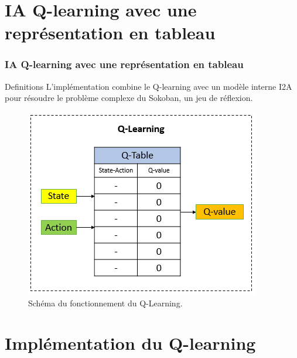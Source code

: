 \documentclass[
	11pt, %
]{beamer}
\begin{document}

\section{IA Q-learning avec une représentation en tableau}

\begin{frame}
	\frametitle{IA Q-learning avec une représentation en tableau}

	\begin{block}{Definitions}
		L'implémentation combine le Q-learning avec un modèle interne I2A pour résoudre le problème complexe du Sokoban, un jeu de réflexion.
	\end{block}

	\smallskip %

	\begin{figure}
		\includegraphics[width=0.5\linewidth]{Images/q_learning.png}
		\caption{Schéma du fonctionnement du Q-Learning.}
	\end{figure}


\end{frame}
\section{Implémentation du Q-learning}
\end{document}

